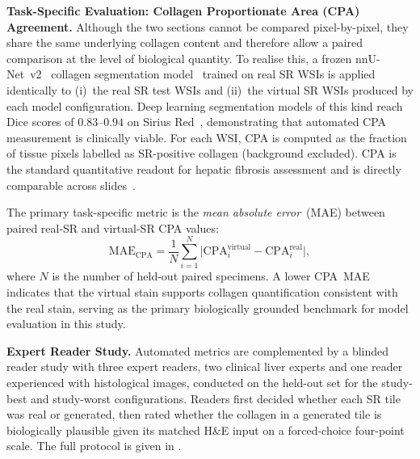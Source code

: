 \noindent\textbf{Task-Specific Evaluation: Collagen Proportionate Area (CPA) Agreement.}
Although the two sections cannot be compared pixel-by-pixel, they share the same
underlying collagen content and therefore allow a paired comparison at the level of
biological quantity. To realise this, a frozen nnU-Net~v2~\cite{isensee2021nnunet}
collagen segmentation model~\cite{deng2026} trained on real SR WSIs is applied
identically to (i)~the real SR test WSIs and (ii)~the virtual SR WSIs produced by each
model configuration.
Deep learning segmentation models of this kind reach Dice scores of $0.83$--$0.94$
on Sirius Red~\cite{liverfibrosis2025, deng2026}, demonstrating that automated CPA
measurement is clinically viable.
For each WSI, CPA is computed as the fraction of tissue pixels labelled as SR-positive
collagen (background excluded).
CPA is the standard quantitative readout for hepatic fibrosis assessment and is
directly comparable across slides~\cite{huang2013sirius}.

The primary task-specific metric is the \textit{mean absolute error}~(MAE) between
paired real-SR and virtual-SR CPA values:
\begin{equation}
  \mathrm{MAE}_{\mathrm{CPA}} = \frac{1}{N}\sum_{i=1}^{N}
  \bigl|\mathrm{CPA}^{\mathrm{virtual}}_{i} - \mathrm{CPA}^{\mathrm{real}}_{i}\bigr|,
  \label{eq:cpa_mae}
\end{equation}
where $N$ is the number of held-out paired specimens.
A lower CPA~MAE indicates that the virtual stain supports collagen quantification
consistent with the real stain, serving as the primary biologically grounded benchmark
for model evaluation in this study.

\noindent\textbf{Expert Reader Study.}
Automated metrics are complemented by a blinded reader study with three expert readers,
two clinical liver experts and one reader experienced with histological images, conducted on the
held-out set for the study-best and study-worst configurations.
Readers first decided whether each SR tile was real or generated, then rated whether the
collagen in a generated tile is biologically plausible given its matched H\&E input on a
forced-choice four-point scale.
The full protocol is given in .


